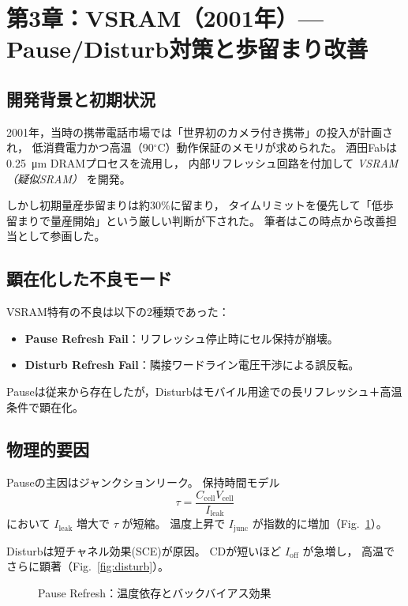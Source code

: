 \documentclass[conference]{IEEEtran}
\let\meter\metre
\begin{document}
\section{第3章：VSRAM（2001年）— Pause/Disturb対策と歩留まり改善}

\subsection{開発背景と初期状況}
2001年，当時の携帯電話市場では「世界初のカメラ付き携帯」の投入が計画され，
低消費電力かつ高温（90$^\circ$C）動作保証のメモリが求められた。
酒田Fabは \SI{0.25}{\micro\meter} DRAMプロセスを流用し，
内部リフレッシュ回路を付加して \emph{VSRAM（疑似SRAM）} を開発。

しかし初期量産歩留まりは約30\%に留まり，
タイムリミットを優先して「低歩留まりで量産開始」という厳しい判断が下された。
筆者はこの時点から改善担当として参画した。

\subsection{顕在化した不良モード}
VSRAM特有の不良は以下の2種類であった：
\begin{itemize}
  \item \textbf{Pause Refresh Fail}：リフレッシュ停止時にセル保持が崩壊。
  \item \textbf{Disturb Refresh Fail}：隣接ワードライン電圧干渉による誤反転。
\end{itemize}

Pauseは従来から存在したが，Disturbはモバイル用途での長リフレッシュ＋高温条件で顕在化。

\subsection{物理的要因}
Pauseの主因はジャンクションリーク。
保持時間モデル
\[
\tau = \frac{C_{\mathrm{cell}} V_{\mathrm{cell}}}{I_{\mathrm{leak}}}
\]
において $I_{\mathrm{leak}}$ 増大で $\tau$ が短縮。
温度上昇で $I_{\mathrm{junc}}$ が指数的に増加（Fig.~\ref{fig:pause}）。

Disturbは短チャネル効果(SCE)が原因。
CDが短いほど $I_{\mathrm{off}}$ が急増し，
高温でさらに顕著（Fig.~\ref{fig:disturb}）。

\begin{figure}[t]
\centering
{}
\caption{Pause Refresh：温度依存とバックバイアス効果}
\label{fig:pause}
\end{figure}
\end{document}
